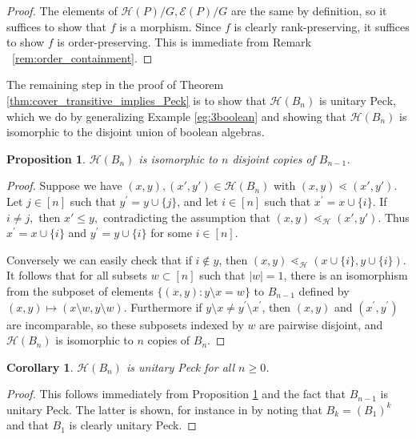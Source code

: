 \documentclass[10 pt]{amsart}
\theoremstyle{plain}
\newtheorem{prop}[thm]{Proposition}
\newtheorem{cor}[thm]{Corollary}
\theoremstyle{definition}
\theoremstyle{remark}
\numberwithin{equation}{section}
\begin{document}
\begin{proof}
The elements of $\mathcal H(P)/G,\mathcal E(P)/G$ are the same by definition, so it suffices to show that $f$ is a morphism. Since $f$ is clearly rank-preserving, it suffices to show $f$ is order-preserving. This is immediate from Remark ~\ref{rem:order_containment}.
\end{proof}

The remaining step in the proof of Theorem \ref{thm:cover_transitive_implies_Peck} is to show that $\mathcal{H}(B_n)$ is unitary Peck, which we do by generalizing Example \ref{eg:3boolean} and showing that $\mathcal{H}(B_n)$ is isomorphic to the disjoint union of boolean algebras.

\begin{prop}\label{prop:computing_HBn}
$\mathcal{H}(B_n)$ is isomorphic to $n$ disjoint copies of $B_{n-1}$.
\end{prop}

\begin{proof}

Suppose we have $(x, y),(x', y') \in \mathcal H(B_n)$ with $(x, y) \lessdot (x', y').$ Let $j\in [n]$ such that $y^\prime = y\cup\{j\}$, and let $i\in [n]$ such that $x^\prime = x\cup \{i\}$. If $i \ne j,$ then $x' \leq y,$ contradicting the assumption that $(x, y) \lessdot_{\mathcal H} (x', y').$ Thus $x^\prime = x\cup\{i\}$ and $y^\prime = y\cup\{i\}$ for some $i\in [n]$.

Conversely we can easily check that if $i\not\in y$, then $(x, y)\lessdot_{\mathcal{H}} (x\cup\{i\}, y\cup\{i\})$.  It follows that for all subsets $w \subset [n]$ such that $|w| = 1$, there is an isomorphism from the subposet of elements $\{(x, y)\colon y\setminus x = w\}$ to $B_{n-1}$ defined by $(x,y)\mapsto (x\setminus w,y\setminus w)$.  Furthermore if $y\setminus x \ne y^\prime \setminus x^\prime$, then $(x, y)$ and $(x^\prime, y^\prime)$ are incomparable, so these subposets indexed by $w$ are pairwise disjoint, and $\mathcal H(B_n)$ is isomorphic to $n$ copies of $B_{n}$.
\end{proof}

\begin{cor}\label{cor:HBn_unitary_peck}
$\mathcal H(B_n)$ is unitary Peck for all $n\ge 0$.
\end{cor}

\begin{proof}
This follows immediately from Proposition \ref{prop:computing_HBn} and the fact that $B_{n-1}$ is unitary Peck.  The latter is shown, for instance in \cite[Theorem 2a]{quotients_stanley} by noting that $B_k = (B_1)^k$ and that $B_1$ is clearly unitary Peck.
\end{proof}
\end{document}
